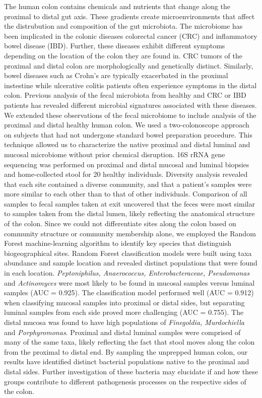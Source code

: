 \documentclass[11pt,]{article}
\begin{document}
The human colon contains chemicals and nutrients that change along the
proximal to distal gut axis. These gradients create microenvironments
that affect the distrubution and composition of the gut microbiota. The
microbiome has been implicated in the colonic diseases colorectal cancer
(CRC) and inflammatory bowel disease (IBD). Further, these diseases
exhibit different symptoms depending on the location of the colon they
are found in. CRC tumors of the proximal and distal colon are
morphologically and genetically distinct. Similarly, bowel diseases such
as Crohn's are typically exacerbated in the proximal instestine while
ulcerative colitis patients often experience symptoms in the distal
colon. Previous analysis of the fecal microbiota from healthy and CRC or
IBD patients has revealed different microbial signatures associated with
these diseases. We extended these observations of the fecal microbiome
to include analysis of the proximal and distal healthy human colon. We
used a two-colonoscope approach on subjects that had not undergone
standard bowel preparation procedure. This technique allowed us to
characterize the native proximal and distal luminal and mucosal
microbiome without prior chemical disruption. 16S rRNA gene sequencing
was performed on proximal and distal mucosal and luminal biopsies and
home-collected stool for 20 healthy individuals. Diversity analysis
revealed that each site contained a diverse community, and that a
patient's samples were more similar to each other than to that of other
individuals. Comparison of all samples to fecal samples taken at exit
uncovered that the feces were most similar to samples taken from the
distal lumen, likely reflecting the anatomical structure of the colon.
Since we could not differentiate sites along the colon based on
community structure or community membership alone, we employed the
Random Forest machine-learning algorithm to identify key species that
distinguish biogeographical sites. Random Forest classification models
were built using taxa abundance and sample location and revealed
distinct populations that were found in each location.
\emph{Peptoniphilus, Anaerococcus, Enterobacteraceae, Pseudomonas} and
\emph{Actinomyces} were most likely to be found in mucosal samples
versus luminal samples (AUC = 0.925). The classification model performed
well (AUC = 0.912) when classifying mucosal samples into proximal or
distal sides, but separating luminal samples from each side proved more
challenging (AUC = 0.755). The distal mucosa was found to have high
populations of \emph{Finegoldia, Murdochiella} and \emph{Porphyromonas}.
Proximal and distal luminal samples were comprised of many of the same
taxa, likely reflecting the fact that stool moves along the colon from
the proximal to distal end. By sampling the unprepped human colon, our
results have identified distinct bacterial populations native to the
proximal and distal sides. Further investigation of these bacteria may
elucidate if and how these groups contribute to different pathogenesis
processes on the respective sides of the colon.
\end{document}

